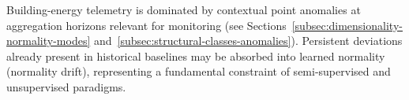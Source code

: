 Building-energy telemetry is dominated by contextual point anomalies at aggregation
horizons relevant for monitoring (see
Sections~\ref{subsec:dimensionality-normality-modes} and~\ref{subsec:structural-classes-anomalies}).
Persistent deviations already present in historical baselines may be absorbed into learned
normality (normality drift), representing a fundamental constraint of semi-supervised and
unsupervised paradigms.